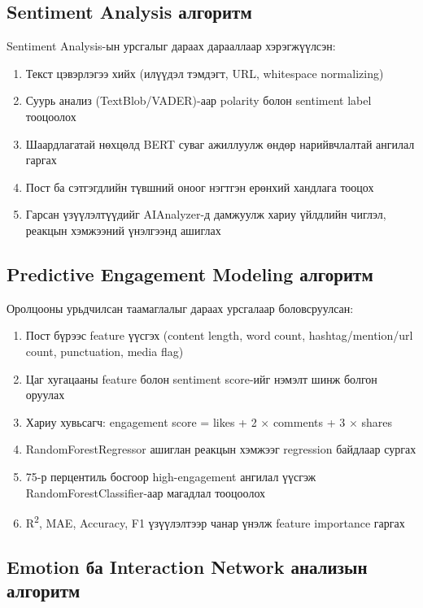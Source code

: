\documentclass[12pt,a4paper]{report}
\begin{document}
\subsection{Sentiment Analysis алгоритм}

Sentiment Analysis-ын урсгалыг дараах дарааллаар хэрэгжүүлсэн:
\begin{enumerate}
    \item Текст цэвэрлэгээ хийх (илүүдэл тэмдэгт, URL, whitespace normalizing)
    \item Суурь анализ (TextBlob/VADER)-аар polarity болон sentiment label тооцоолох
    \item Шаардлагатай нөхцөлд BERT суваг ажиллуулж өндөр нарийвчлалтай ангилал гаргах
    \item Пост ба сэтгэгдлийн түвшний оноог нэгтгэн ерөнхий хандлага тооцох
    \item Гарсан үзүүлэлтүүдийг AIAnalyzer-д дамжуулж хариу үйлдлийн чиглэл, реакцын хэмжээний үнэлгээнд ашиглах
\end{enumerate}

\subsection{Predictive Engagement Modeling алгоритм}

Оролцооны урьдчилсан таамаглалыг дараах урсгалаар боловсруулсан:
\begin{enumerate}
    \item Пост бүрээс feature үүсгэх (content length, word count, hashtag/mention/url count, punctuation, media flag)
    \item Цаг хугацааны feature болон sentiment score-ийг нэмэлт шинж болгон оруулах
    \item Хариу хувьсагч: engagement score = likes + 2 $\times$ comments + 3 $\times$ shares
    \item RandomForestRegressor ашиглан реакцын хэмжээг regression байдлаар сургах
    \item 75-р перцентиль босгоор high-engagement ангилал үүсгэж RandomForestClassifier-аар магадлал тооцоолох
    \item R\textsuperscript{2}, MAE, Accuracy, F1 үзүүлэлтээр чанар үнэлж feature importance гаргах
\end{enumerate}

\subsection{Emotion ба Interaction Network анализын алгоритм}
\end{document}
